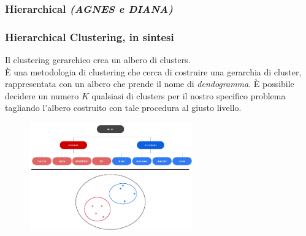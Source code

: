 
\subsubsection[Hierarchical (AGNES e DIANA)]{Hierarchical \textit{(AGNES e DIANA)}}
\begin{frame}

	\frametitle{{\color{GradientDescentDiagramGreen}Hierarchical Clustering}, in sintesi}

		Il clustering gerarchico crea un albero di clusters.\\
		È una metodologia di clustering che cerca di costruire una gerarchia di cluster, rappresentata con un albero che prende il nome di \emph{dendogramma}.\newlinedouble
		È possibile decidere un numero $K$ qualsiasi di clusters per il nostro specifico problema tagliando l'albero costruito con tale procedura al giusto livello.
		\begin{figure}[!htbp]
			\centering
			\includegraphics[width=7.0cm]{images/unsupervised/types/Clustering_Hierarchical.pdf}
		\end{figure}

\end{frame}


